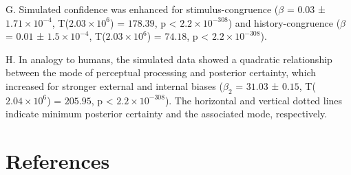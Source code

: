 \documentclass[
]{article}
\begin{document}
G. Simulated confidence was enhanced for stimulus-congruence (\(\beta\)
= \(0.03\) ± \(\ensuremath{1.71\times 10^{-4}}\),
T(\(\ensuremath{2.03\times 10^{6}}\)) = \(178.39\), p < \(\ensuremath{2.2\times 10^{-308}}\)) and
history-congruence (\(\beta\) = \(0.01\) ±
\(\ensuremath{1.5\times 10^{-4}}\),
T(\(\ensuremath{2.03\times 10^{6}}\)) = \(74.18\), p < \(\ensuremath{2.2\times 10^{-308}}\)).

H. In analogy to humans, the simulated data showed a quadratic
relationship between the mode of perceptual processing and posterior
certainty, which increased for stronger external and internal biases
(\(\beta_2\) = \(31.03\) ± \(0.15\),
T(\(\ensuremath{2.04\times 10^{6}}\)) = \(205.95\), p < \(\ensuremath{2.2\times 10^{-308}}\)). The
horizontal and vertical dotted lines indicate minimum posterior
certainty and the associated mode, respectively.

\newpage
\hypertarget{references}{%
\section*{References}\label{references}}
\end{document}

